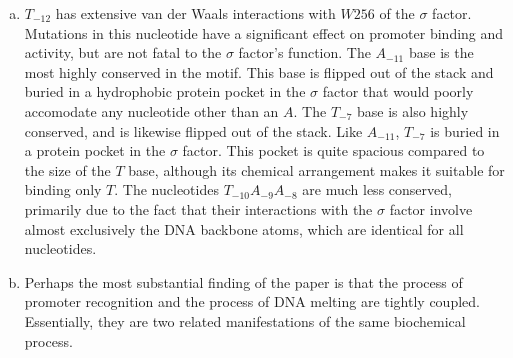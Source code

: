 \documentclass[a4paper, 10pt]{article}
\begin{document}
\begin{enumerate}[a)]
  \item $T_{-12}$ has extensive van der Waals interactions with $W256$ of the $\sigma$ factor.
        Mutations in this nucleotide have a significant effect on promoter binding and activity, but are not fatal to the $\sigma$ factor's function.
        The $A_{-11}$ base is the most highly conserved in the motif.
        This base is flipped out of the stack and buried in a hydrophobic protein pocket in the $\sigma$ factor that would poorly accomodate any nucleotide other than an $A$. 
        The $T_{-7}$ base is also highly conserved, and is likewise flipped out of the stack.
        Like $A_{-11}$, $T_{-7}$ is buried in a protein pocket in the $\sigma$ factor. 
        This pocket is quite spacious compared to the size of the $T$ base, although its chemical arrangement makes it suitable for binding only $T$.
        The nucleotides $T_{-10}A_{-9}A_{-8}$ are much less conserved, primarily due to the fact that their interactions with the $\sigma$ factor involve almost exclusively the DNA backbone atoms, which are identical for all nucleotides.
  \item Perhaps the most substantial finding of the paper is that the process of promoter recognition and the process of DNA melting are tightly coupled. Essentially, they are two related manifestations of the same biochemical process.
\end{enumerate}
\end{document}
